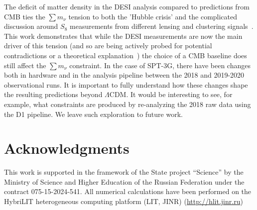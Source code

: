 \documentclass[12pt,a4paper]{article}
\renewcommand\L{\Lambda}
\newcommand\?{/\hspace{0pt}}
\def\Mnu{\sum m_\nu}
\begin{document}
The deficit of matter density in the DESI analysis compared to predictions from CMB ties the $\Mnu$ tension to both the 'Hubble crisis' and the complicated discussion around $S_8$ measurements from different lensing and clustering signals~\cite{CosmoVerseNetwork:2025alb,McCarthy:2024tvp,Artis:2024zag}. This work demonstrates that while the DESI measurements are now the main driver of this tension (and so are being actively probed for potential contradictions or a theoretical explanation~\cite{CosmoVerseNetwork:2025alb}) the choice of a CMB baseline does still affect the $\Mnu$ constraint. In the case of SPT-3G, there have been changes both in hardware and in the analysis pipeline between the 2018 and 2019-2020 observational runs. It is important to fully understand how these changes shape the resulting predictions beyond $\L$CDM. It would be interesting to see, for example, what constraints are produced by re-analyzing the 2018 raw data using the D1 pipeline. We leave such exploration to future work.




\vspace{1cm}
\section*{Acknowledgments}

This work is supported in the framework of the State project ``Science'' by the Ministry of Science and Higher Education of the Russian Federation under the contract 075-15-2024-541. All numerical calculations have been performed on the HybriLIT heterogeneous computing platform (LIT, JINR) (\href{http://hlit.jinr.ru}{http://hlit.jinr.ru})  %









\end{document}
